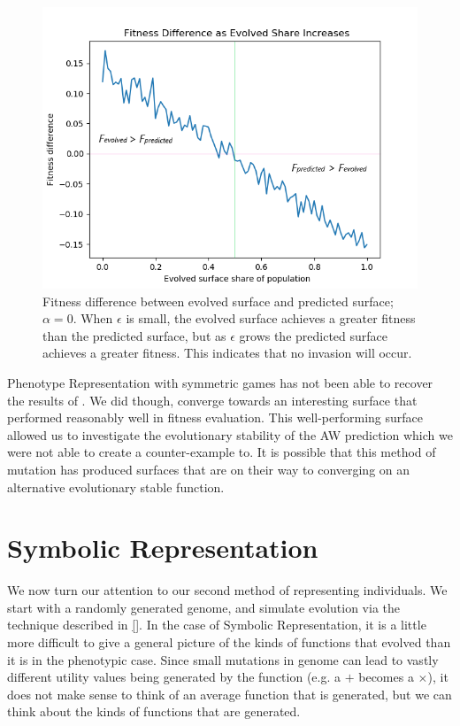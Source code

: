 \documentclass[11pt]{book}
\newcommand*{\np}{\par\noindent\newline}
\begin{document}
\begin{figure}
	\centering
	\includegraphics[scale=0.7]{resources/linegraph_fitness_difference_increasing_epsilon.png}
	\caption{Fitness difference between evolved surface and predicted surface; $\alpha = 0$.
	When $\epsilon$ is small, the evolved surface achieves a greater fitness than the predicted surface, but as $\epsilon$ grows the predicted surface achieves a greater fitness.
	This indicates that no invasion will occur.}
	\label{linegraph_fitness_difference_increasing_epsilon}
\end{figure}
\np Phenotype Representation with symmetric games has not been able to recover the results of \citet{alger_generalization_2012}.
We did though, converge towards an interesting surface that performed reasonably well in fitness evaluation.
This well-performing surface allowed us to investigate the evolutionary stability of the AW prediction which we were not able to create a counter-example to. 
It is possible that this method of mutation has produced surfaces that are on their way to converging on an alternative evolutionary stable function.


\section{Symbolic Representation}\label{symmetricGames_symb}

We now turn our attention to our second method of representing individuals.
We start with a randomly generated genome, and simulate evolution via the technique described in \ref{}.
In the case of Symbolic Representation, it is a little more difficult to give a general picture of the kinds of functions that evolved than it is in the phenotypic case.
Since small mutations in genome can lead to vastly different utility values being generated by the function (e.g. a $+$ becomes a $\times$), it does not make sense to think of an average function that is generated,
but we can think about the kinds of functions that are generated.
\end{document}
